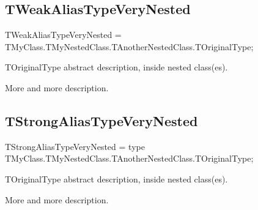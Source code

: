 \documentclass{report}
\newif\ifpdf
\begin{document}
\subsection*{TWeakAliasTypeVeryNested}
\fi
\label{ok_type_aliases-TWeakAliasTypeVeryNested}
\begin{list}{}{
\setlength{\itemindent}{0cm}
\setlength{\listparindent}{0cm}
\setlength{\leftmargin}{\evensidemargin}
\addtolength{\leftmargin}{\tmplength}
\settowidth{\labelsep}{X}
\addtolength{\leftmargin}{\labelsep}
\setlength{\labelwidth}{\tmplength}
}
\item[\textbf{Declaration}\hfill]
\ifpdf
\begin{flushleft}
\fi
\begin{ttfamily}
TWeakAliasTypeVeryNested = TMyClass.TMyNestedClass.TAnotherNestedClass.TOriginalType;\end{ttfamily}

\ifpdf
\end{flushleft}
\fi

\par
\item[\textbf{Description}]
TOriginalType abstract description, inside nested class(es).\hfill\vspace*{1ex}

 More and more description.

\end{list}
\ifpdf
\subsection*{\large{\textbf{TStrongAliasTypeVeryNested}}\normalsize\hspace{1ex}\hrulefill}
\else
\subsection*{TStrongAliasTypeVeryNested}
\fi
\label{ok_type_aliases-TStrongAliasTypeVeryNested}
\begin{list}{}{
\setlength{\itemindent}{0cm}
\setlength{\listparindent}{0cm}
\setlength{\leftmargin}{\evensidemargin}
\addtolength{\leftmargin}{\tmplength}
\settowidth{\labelsep}{X}
\addtolength{\leftmargin}{\labelsep}
\setlength{\labelwidth}{\tmplength}
}
\item[\textbf{Declaration}\hfill]
\ifpdf
\begin{flushleft}
\fi
\begin{ttfamily}
TStrongAliasTypeVeryNested = type TMyClass.TMyNestedClass.TAnotherNestedClass.TOriginalType;\end{ttfamily}

\ifpdf
\end{flushleft}
\fi

\par
\item[\textbf{Description}]
TOriginalType abstract description, inside nested class(es).\hfill\vspace*{1ex}

 More and more description.

\end{list}
\ifpdf
\end{document}
